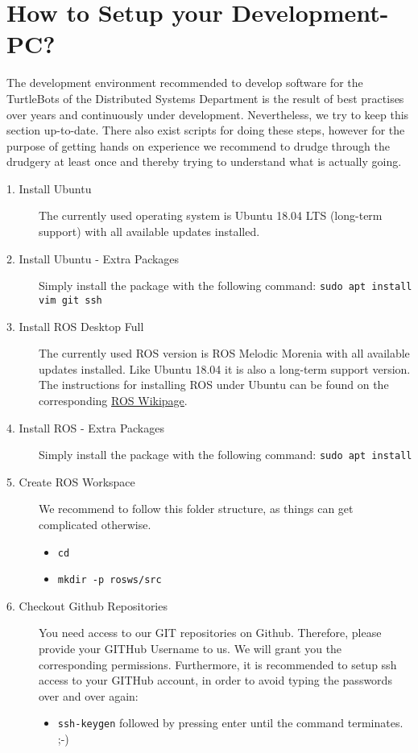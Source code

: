 \section{How to Setup your Development-PC?}
\label{sec:SetupPC}

The development environment recommended to develop software for the TurtleBots of the Distributed Systems Department is the result of best practises over years and continuously under development. Nevertheless, we try to keep this section up-to-date. There also exist scripts for doing these steps, however for the purpose of getting hands on experience we recommend to drudge through the drudgery at least once and thereby trying to understand what is actually going.

\begin{description}
	\item[1. Install Ubuntu] The currently used operating system is Ubuntu 18.04 LTS (long-term support) with all available updates installed.
	\item[2. Install Ubuntu - Extra Packages] Simply install the package with the following command: \verb#sudo apt install vim git ssh #
	\item[3. Install ROS Desktop Full] The currently used ROS version is ROS Melodic Morenia with all available updates installed. Like Ubuntu 18.04 it is also a long-term support version. The instructions for installing ROS under Ubuntu can be found on the corresponding \href{http://wiki.ros.org/melodic/Installation/Ubuntu}{ROS Wikipage}.
	\item[4. Install ROS - Extra Packages] Simply install the package with the following command: \verb#sudo apt install #
	\item[5. Create ROS Workspace] We recommend to follow this folder structure, as things can get complicated otherwise. 
	\begin{itemize}
		\item \verb#cd#
		\item \verb#mkdir -p rosws/src#
	\end{itemize}
	\item[6. Checkout Github Repositories] You need access to our GIT repositories on Github. Therefore, please provide your GITHub Username to us. We will grant you the corresponding permissions. Furthermore, it is recommended to setup ssh access to your GITHub account, in order to avoid typing the passwords over and over again:
	\begin{itemize}
		\item \verb#ssh-keygen# followed by pressing enter until the command terminates. ;-)

\end{itemize}
\end{description}
